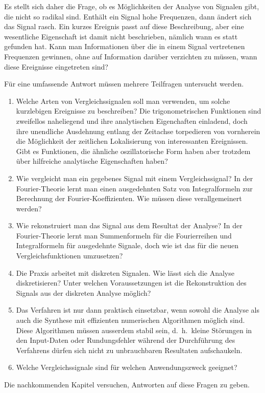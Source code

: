 Es stellt sich daher die Frage, ob es Möglichkeiten der Analyse von Signalen
gibt, die nicht so radikal sind.
Enthält ein Signal hohe Frequenzen, dann ändert sich das Signal rasch.
Ein kurzes Ereignis passt auf diese Beschreibung, aber eine wesentliche
Eigenschaft ist damit nicht beschrieben, nämlich wann es statt gefunden hat.
Kann man Informationen über die in einem Signal vertretenen Frequenzen gewinnen,
ohne auf Information darüber verzichten zu müssen, wann diese Ereignisse
eingetreten sind?

Für eine umfassende Antwort müssen mehrere Teilfragen untersucht werden.
\begin{enumerate}
\item
Welche Arten von Vergleichssignalen soll man verwenden, um solche kurzlebigen
Ereignisse zu beschreiben?
Die trigonometrischen Funktionen sind zweifellos naheliegend und ihre
analytischen Eigenchaften einladend, doch ihre unendliche Ausdehnung entlang
der Zeitachse torpedieren von vornherein die Möglichkeit der zeitlichen
Lokalisierung von interessanten Ereignissen.
Gibt es Funktionen, die ähnliche oszillatorische Form haben
aber trotzdem über hilfreiche analytische Eigenschaften haben?
\item
Wie vergleicht man ein gegebenes Signal mit einem Vergleichssignal?
In der Fourier-Theorie lernt man einen ausgedehnten Satz von Integralformeln
zur Berechnung der Fourier-Koeffizien\-ten.
Wie müssen diese verallgemeinert werden?
\item
Wie rekonstruiert man das Signal aus dem Resultat der Analyse?
In der Fourier-Theorie lernt man Summenformeln für die Fourierreihen
und Integralformeln für ausgedehnte Signale, doch wie ist das für 
die neuen Vergleichsfunktionen umzusetzen?
\item
Die Praxis arbeitet mit diskreten Signalen. 
Wie lässt sich die Analyse diskretisieren?
Unter welchen Voraussetzungen ist die Rekonstruktion des Signals
aus der diskreten Analyse möglich?
\item
Das Verfahren ist nur dann praktisch einsetzbar, wenn sowohl die Analyse als
auch die Synthese mit effizienten numerischen Algorithmen möglich sind.
Diese Algorithmen müssen ausserdem stabil sein, d.~h.~kleine Störungen in
den Input-Daten oder Rundungsfehler während der Durchführung des Verfahrens
dürfen sich nicht zu unbrauchbaren Resultaten aufschaukeln.
\item
Welche Vergleichssignale sind für welchen Anwendungszweck geeignet?
\end{enumerate}
Die nachkommenden Kapitel versuchen, Antworten auf diese Fragen zu
geben.

